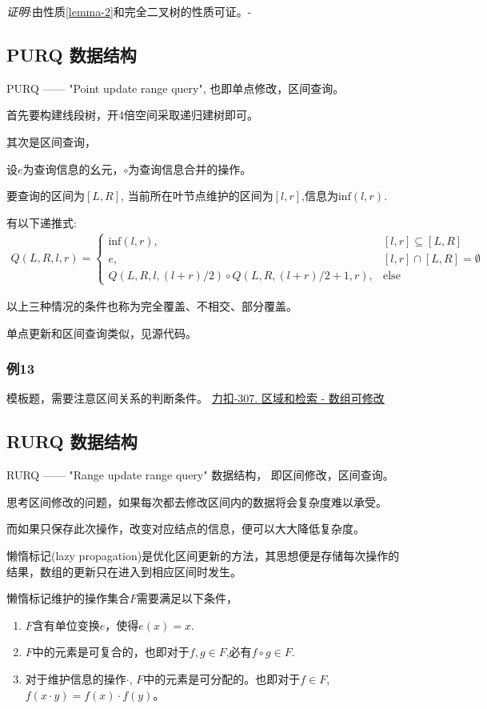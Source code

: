 \documentclass{article}
\newcommand{\Inf}{\text{inf}}
\newcommand{\Else}{\text{else}}
\newcommand{\inputcppfile}[1]{}
\begin{document}
\emph{证明}:由性质\ref{lemma-2}和完全二叉树的性质可证。-

\subsection{PURQ 数据结构}
PURQ —— "Point update range query", 也即单点修改，区间查询。

首先要构建线段树，开4倍空间采取递归建树即可。

其次是区间查询，

设$e$为查询信息的幺元，$\circ$为查询信息合并的操作。

要查询的区间为$[L,R]$, 当前所在叶节点维护的区间为$[l,r]$,信息为$\Inf(l,r)$.

有以下递推式:
\begin{align*}
    Q(L,R,l,r) = \begin{cases}
        \Inf(l,r) , & [l,r] \subseteq [L,R] \\
        e, & [l,r] \cap [L,R] = \emptyset \\
        Q(L,R,l,(l+r)/2) \circ Q(L,R,(l+r)/2+1,r), & \Else 
    \end{cases}  
\end{align*}

以上三种情况的条件也称为完全覆盖、不相交、部分覆盖。

单点更新和区间查询类似，见源代码。

\subsubsection{例13}
模板题，需要注意区间关系的判断条件。
\href{https://leetcode.cn/problems/range-sum-query-mutable/description/}{力扣-307. 区域和检索 - 数组可修改}
\inputcppfile{Code_13.cpp}

\subsection{RURQ 数据结构}
RURQ —— "Range update range query" 数据结构， 即区间修改，区间查询。

思考区间修改的问题，如果每次都去修改区间内的数据将会复杂度难以承受。

而如果只保存此次操作，改变对应结点的信息，便可以大大降低复杂度。

懒惰标记(lazy propagation)是优化区间更新的方法，其思想便是存储每次操作的结果，数组的更新只在进入到相应区间时发生。

懒惰标记维护的操作集合$F$需要满足以下条件，
\begin{enumerate}
    \item $F$含有单位变换$e$，使得$e(x) = x$.
    \item $F$中的元素是可复合的，也即对于$f,g\in F$,必有$f \circ g  \in F$.
    \item 对于维护信息的操作$\cdot$, $F$中的元素是可分配的。也即对于$f \in F$, $f(x\cdot y) = f(x)\cdot f(y)$。
\end{enumerate}
\end{document}
